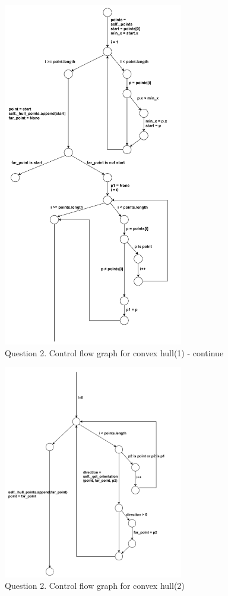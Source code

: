 \documentclass[12pt]{article}
\begin{document}
\begin{figure}[h!]
  \centering
  \includegraphics[width=0.7\textwidth]{Figures/Q2_1.png}
  \caption{Question 2. Control flow graph for convex hull(1) - continue}
\end{figure}

\begin{figure}[h!]
  \centering
  \includegraphics[width=0.7\textwidth]{Figures/Q2_2.png}
  \caption{Question 2. Control flow graph for convex hull(2)}
\end{figure}
\end{document}
